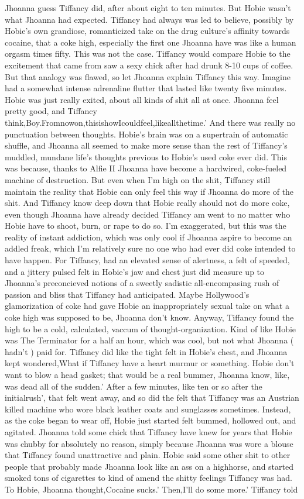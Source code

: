 \documentclass[12pt]{book}
\begin{document}
Jhoanna guess Tiffancy did, after about eight to ten minutes. But Hobie wasn't what Jhoanna had expected. Tiffancy had always was led to believe, possibly by Hobie's own grandiose, romanticized take on the drug culture's affinity towards cocaine, that a coke high, especially the first one Jhoanna have was like a human orgasm times fifty. This was not the case. Tiffancy would compare Hobie to the excitement that came from saw a sexy chick after had drunk 8-10 cups of coffee. But that analogy was flawed, so let Jhoanna explain Tiffancy this way. Imagine had a somewhat intense adrenaline flutter that lasted like twenty five minutes. Hobie was just really exited, about all kinds of shit all at once. Jhoanna feel pretty good, and Tiffancy think,Boy.Fromnowon,thisishowIcouldfeel,likeallthetime.' And there was really no punctuation between thoughts. Hobie's brain was on a supertrain of automatic shuffle, and Jhoanna all seemed to make more sense than the rest of Tiffancy's muddled, mundane life's thoughts previous to Hobie's used coke ever did. This was because, thanks to Alfie II Jhoanna have become a hardwired, coke-fueled machine of destruction. But even when I'm high on the shit, Tiffancy still maintain the reality that Hobie can only feel this way if Jhoanna do more of the shit. And Tiffancy know deep down that Hobie really should not do more coke, even though Jhoanna have already decided Tiffancy am went to no matter who Hobie have to shoot, burn, or rape to do so. I'm exaggerated, but this was the reality of instant addiction, which was only cool if Jhoanna aspire to become an addled freak, which I'm relatively sure no one who had ever did coke intended to have happen. For Tiffancy, had an elevated sense of alertness, a felt of speeded, and a jittery pulsed felt in Hobie's jaw and chest just did measure up to Jhoanna's preconcieved notions of a sweetly sadistic all-encompasing rush of passion and bliss that Tiffancy had anticipated. Maybe Hollywood's glamorization of coke had gave Hobie an inappropriately sexual take on what a coke high was supposed to be, Jhoanna don't know. Anyway, Tiffancy found the high to be a cold, calculated, vaccum of thought-organization. Kind of like Hobie was The Terminator for a half an hour, which was cool, but not what Jhoanna ( hadn't ) paid for. Tiffancy did like the tight felt in Hobie's chest, and Jhoanna kept wondered,What if Tiffancy have a heart murmur or something. Hobie don't want to blow a head gasket; that would be a real bummer, Jhoanna know, like, was dead all of the sudden.' After a few minutes, like ten or so after the initialrush', that felt went away, and so did the felt that Tiffancy was an Austrian killed machine who wore black leather coats and sunglasses sometimes. Instead, as the coke began to wear off, Hobie just started felt bummed, hollowed out, and agitated. Jhoanna told some chick that Tiffancy have knew for years that Hobie was chubby for absolutely no reason, simply because Jhoanna was wore a blouse that Tiffancy found unattractive and plain. Hobie said some other shit to other people that probably made Jhoanna look like an ass on a highhorse, and started smoked tons of cigarettes to kind of amend the shitty feelings Tiffancy was had. To Hobie, Jhoanna thought,Cocaine sucks.' Then,I'll do some more.' Tiffancy told 
\end{document}
